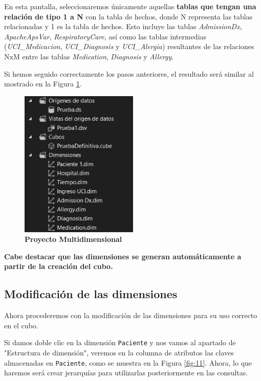 \documentclass[12pt, a4paper, twoside]{article}
\begin{document}
En esta pantalla, seleccionaremos únicamente aquellas \textbf{tablas que tengan una relación de tipo 1 a N} con la tabla de hechos, donde N representa las tablas relacionadas y 1 es la tabla de hechos. Esto incluye las tablas \textit{AdmissionDx}, \textit{ApacheApsVar}, \textit{RespiratoryCare}, así como las tablas intermedias (\textit{UCI\_Medicacion}, \textit{UCI\_Diagnosis} y \textit{UCI\_Alergia}) resultantes de las relaciones NxM entre las tablas \textit{Medication}, \textit{Diagnosis} y \textit{Allergy}.

Si hemos seguido correctamente los pasos anteriores, el resultado será similar al mostrado en la Figura \ref{fig:8}.

\begin{figure}[H]
	\centering
	\includegraphics[width=0.5\textwidth]{image/loquellevamos}
	\caption{\textbf{Proyecto Multidimensional}}
	\label{fig:8}
\end{figure}

\textbf{Cabe destacar que las dimensiones se generan automáticamente a partir de la creación del cubo.}

	
\subsection{Modificación de las dimensiones}

Ahora procederemos con la modificación de las dimensiones para su uso correcto en el cubo.

Si damos doble clic en la dimensión \texttt{Paciente} y nos vamos al apartado de "Estructura de dimensión", veremos en la columna de atributos las claves almacenadas en \texttt{Paciente}, como se muestra en la Figura \ref{fig:11}. Ahora, lo que haremos será crear jerarquías para utilizarlas posteriormente en las consultas.
\end{document}
